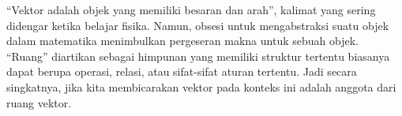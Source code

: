 ``Vektor adalah objek yang memiliki besaran dan arah'', kalimat yang sering didengar ketika belajar fisika. Namun, obsesi untuk mengabstraksi suatu objek dalam matematika menimbulkan pergeseran makna untuk sebuah objek.\\

``Ruang'' diartikan sebagai himpunan yang memiliki struktur tertentu biasanya dapat berupa operasi, relasi, atau sifat-sifat aturan tertentu. Jadi secara singkatnya, jika kita membicarakan vektor pada konteks ini adalah anggota dari ruang vektor.